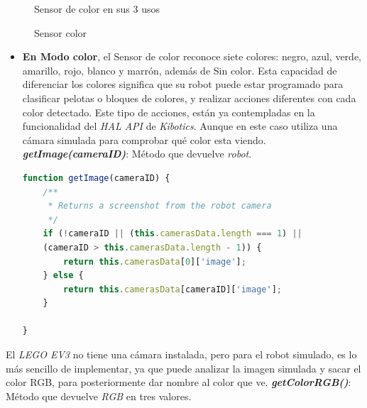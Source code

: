 \begin{figure}
    \caption{Sensor color}{{\footnotesize Sensor de color en sus 3 usos}}
    \label{fig:color}
\end{figure}

\begin{itemize}
\item\textbf{En Modo color}, el Sensor de color reconoce siete colores: negro,
azul, verde, amarillo, rojo, blanco y marrón, además de Sin color. Esta capacidad de diferenciar los colores significa que su robot puede estar programado para clasificar pelotas o bloques de colores, y realizar acciones diferentes con cada color detectado.\newline
Este tipo de acciones, están ya contempladas en la funcionalidad del \textit{HAL API} de \textit{Kibotics}. Aunque en este caso utiliza una cámara simulada para comprobar qué color esta viendo.\newline
\textit{\textbf{getImage(cameraID)}}: Método que devuelve  \textit{robot}. 
    
    \begin{lstlisting}[language=javascript]
   function getImage(cameraID) {
    /**
     * Returns a screenshot from the robot camera
     */
    if (!cameraID || (this.camerasData.length === 1) || 
    (cameraID > this.camerasData.length - 1)) {
        return this.camerasData[0]['image'];
    } else {
        return this.camerasData[cameraID]['image'];
    }

}
    \end{lstlisting}
\end{itemize}

El \textit{LEGO EV3} no tiene una cámara instalada, pero para el robot simulado, es lo más sencillo de implementar, ya que puede analizar la imagen simulada y sacar el color RGB, para posteriormente dar nombre al color que ve.\newline
\textit{\textbf{getColorRGB()}}: Método que devuelve  \textit{RGB} en tres valores. 
    
